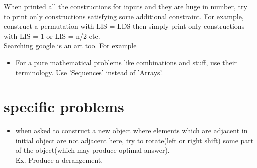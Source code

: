 \documentclass[../Notes.tex]{subfiles}
\begin{document}
When printed all the constructions for inputs and they are huge in number, try to print only constructions satisfying some additional constraint. For example, construct a permutation with LIS = LDS  then simply print only constructions with LIS = 1 or LIS = n/2 etc.\\

Searching google is an art too. For example
\begin{itemize}
	\item For a pure mathematical problems like combinations and stuff, use their terminology. Use 'Sequences' instead of 'Arrays'.
\end{itemize}

\section{specific problems}
\begin{itemize}
	\item when asked to construct a new object where elements which are adjacent in initial object are not adjacent here, try to rotate(left or right shift) some part of the object(which may produce optimal answer). \\Ex. Produce a derangement.
\end{itemize}
\end{document}

